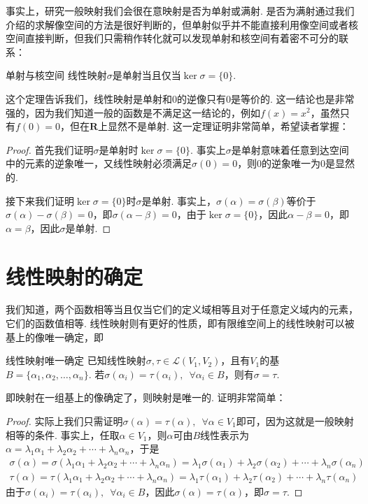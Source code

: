 事实上，研究一般映射我们会很在意映射是否为单射或满射. 是否为满射通过我们介绍的求解像空间的方法是很好判断的，但单射似乎并不能直接利用像空间或者核空间直接判断，但我们只需稍作转化就可以发现单射和核空间有着密不可分的联系：
\begin{theorem}{}{单射与核空间}
    线性映射$\sigma$是单射当且仅当$\ker \sigma=\{0\}$.
\end{theorem}
这个定理告诉我们，线性映射是单射和0的逆像只有0是等价的. 这一结论也是非常强的，因为我们知道一般的函数是不满足这一结论的，例如$f(x)=x^2$，虽然只有$f(0)=0$，但在$\mathbf{R}$上显然不是单射. 这一定理证明非常简单，希望读者掌握：

\begin{proof}
    首先我们证明$\sigma$是单射时$\ker\sigma=\{0\}$. 事实上$\sigma$是单射意味着任意到达空间中的元素的逆象唯一，又线性映射必须满足$\sigma(0)=0$，则0的逆象唯一为0是显然的.

    接下来我们证明$\ker \sigma=\{0\}$时$\sigma$是单射. 事实上，$\sigma(\alpha)=\sigma(\beta)$等价于$\sigma(\alpha)-\sigma(\beta)=0$，即$\sigma(\alpha-\beta)=0$，由于$\ker \sigma=\{0\}$，因此$\alpha-\beta=0$，即$\alpha=\beta$，因此$\sigma$是单射.
\end{proof}

\section{线性映射的确定}

我们知道，两个函数相等当且仅当它们的定义域相等且对于任意定义域内的元素，它们的函数值相等. 线性映射则有更好的性质，即有限维空间上的线性映射可以被基上的像唯一确定，即
\begin{theorem}{}{线性映射唯一确定}
    已知线性映射$\sigma,\tau\in \mathcal{L}(V_1,V_2)$，且有$V_1$的基$B=\{\alpha_1,\alpha_2,\ldots,\alpha_n\}$. 若$\sigma(\alpha_i)=\tau(\alpha_i),\enspace\forall \alpha_i \in B$，则有$\sigma=\tau$.
\end{theorem}
即映射在一组基上的像确定了，则映射是唯一的. 证明非常简单：

\begin{proof}
    实际上我们只需证明$\sigma(\alpha)=\tau(\alpha),\enspace\forall \alpha \in V_1$即可，因为这就是一般映射相等的条件. 事实上，任取$\alpha \in V_1$，则$\alpha$可由$B$线性表示为$\alpha=\lambda_1\alpha_1+\lambda_2\alpha_2+\cdots+\lambda_n\alpha_n$，于是
    \begin{gather*}
        \sigma(\alpha)=\sigma(\lambda_1\alpha_1+\lambda_2\alpha_2+\cdots+\lambda_n\alpha_n)=\lambda_1\sigma(\alpha_1)+\lambda_2\sigma(\alpha_2)+\cdots+\lambda_n\sigma(\alpha_n) \\
        \tau(\alpha)=\tau(\lambda_1\alpha_1+\lambda_2\alpha_2+\cdots+\lambda_n\alpha_n)=\lambda_1\tau(\alpha_1)+\lambda_2\tau(\alpha_2)+\cdots+\lambda_n\tau(\alpha_n)
    \end{gather*}
    由于$\sigma(\alpha_i)=\tau(\alpha_i),\enspace\forall \alpha_i \in B$，因此$\sigma(\alpha)=\tau(\alpha)$，即$\sigma=\tau$.
\end{proof}

